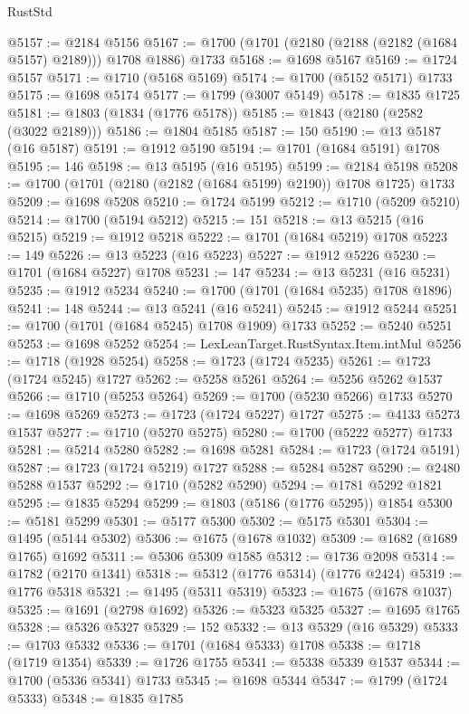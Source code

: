 \begin{lexlean}{RustStd}
\begin{coremodule}
@5157 := @2184 @5156
@5167 := @1700 (@1701 (@2180 (@2188 (@2182 (@1684 @5157) @2189))) @1708 @1886) @1733
@5168 := @1698 @5167
@5169 := @1724 @5157
@5171 := @1710 (@5168 @5169)
@5174 := @1700 (@5152 @5171) @1733
@5175 := @1698 @5174
@5177 := @1799 (@3007 @5149)
@5178 := @1835 @1725
@5181 := @1803 (@1834 (@1776 @5178))
@5185 := @1843 (@2180 (@2582 (@3022 @2189)))
@5186 := @1804 @5185
@5187 := 150
@5190 := @13 @5187 (@16 @5187)
@5191 := @1912 @5190
@5194 := @1701 (@1684 @5191) @1708
@5195 := 146
@5198 := @13 @5195 (@16 @5195)
@5199 := @2184 @5198
@5208 := @1700 (@1701 (@2180 (@2182 (@1684 @5199) @2190)) @1708 @1725) @1733
@5209 := @1698 @5208
@5210 := @1724 @5199
@5212 := @1710 (@5209 @5210)
@5214 := @1700 (@5194 @5212)
@5215 := 151
@5218 := @13 @5215 (@16 @5215)
@5219 := @1912 @5218
@5222 := @1701 (@1684 @5219) @1708
@5223 := 149
@5226 := @13 @5223 (@16 @5223)
@5227 := @1912 @5226
@5230 := @1701 (@1684 @5227) @1708
@5231 := 147
@5234 := @13 @5231 (@16 @5231)
@5235 := @1912 @5234
@5240 := @1700 (@1701 (@1684 @5235) @1708 @1896)
@5241 := 148
@5244 := @13 @5241 (@16 @5241)
@5245 := @1912 @5244
@5251 := @1700 (@1701 (@1684 @5245) @1708 @1909) @1733
@5252 := @5240 @5251
@5253 := @1698 @5252
@5254 := LexLeanTarget.RustSyntax.Item.intMul
@5256 := @1718 (@1928 @5254)
@5258 := @1723 (@1724 @5235)
@5261 := @1723 (@1724 @5245) @1727
@5262 := @5258 @5261
@5264 := @5256 @5262 @1537
@5266 := @1710 (@5253 @5264)
@5269 := @1700 (@5230 @5266) @1733
@5270 := @1698 @5269
@5273 := @1723 (@1724 @5227) @1727
@5275 := @4133 @5273 @1537
@5277 := @1710 (@5270 @5275)
@5280 := @1700 (@5222 @5277) @1733
@5281 := @5214 @5280
@5282 := @1698 @5281
@5284 := @1723 (@1724 @5191)
@5287 := @1723 (@1724 @5219) @1727
@5288 := @5284 @5287
@5290 := @2480 @5288 @1537
@5292 := @1710 (@5282 @5290)
@5294 := @1781 @5292 @1821
@5295 := @1835 @5294
@5299 := @1803 (@5186 (@1776 @5295)) @1854
@5300 := @5181 @5299
@5301 := @5177 @5300
@5302 := @5175 @5301
@5304 := @1495 (@5144 @5302)
@5306 := @1675 (@1678 @1032)
@5309 := @1682 (@1689 @1765) @1692
@5311 := @5306 @5309 @1585
@5312 := @1736 @2098
@5314 := @1782 (@2170 @1341)
@5318 := @5312 (@1776 @5314) (@1776 @2424)
@5319 := @1776 @5318
@5321 := @1495 (@5311 @5319)
@5323 := @1675 (@1678 @1037)
@5325 := @1691 (@2798 @1692)
@5326 := @5323 @5325
@5327 := @1695 @1765
@5328 := @5326 @5327
@5329 := 152
@5332 := @13 @5329 (@16 @5329)
@5333 := @1703 @5332
@5336 := @1701 (@1684 @5333) @1708
@5338 := @1718 (@1719 @1354)
@5339 := @1726 @1755
@5341 := @5338 @5339 @1537
@5344 := @1700 (@5336 @5341) @1733
@5345 := @1698 @5344
@5347 := @1799 (@1724 @5333)
@5348 := @1835 @1785

\end{coremodule}
\end{lexlean}
